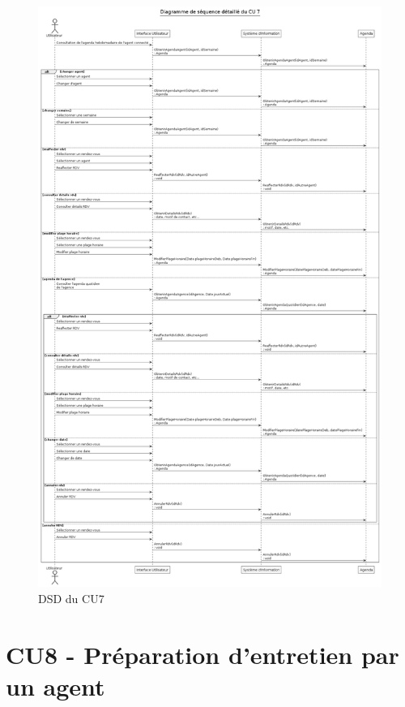 \begin{figure}[H]
\centering
\includegraphics[width=\textwidth]{figures/DSD_CU7.png}
\caption{DSD du CU7}
\end{figure}

\clearpage
\section{CU8 - Préparation d’entretien par un agent}

